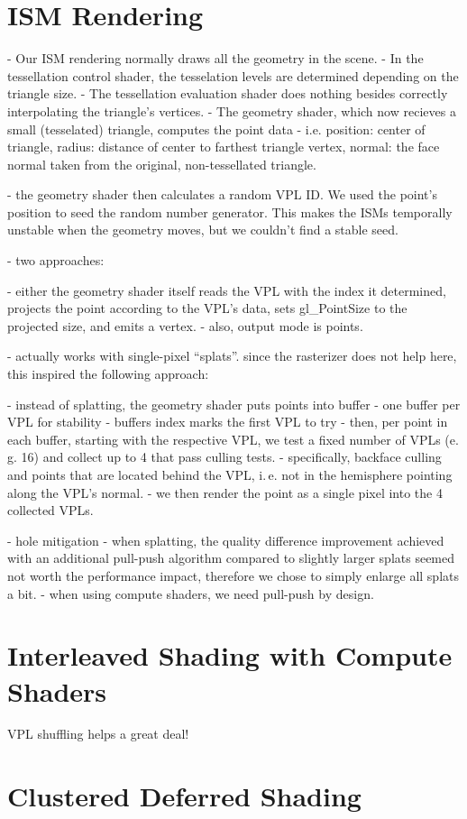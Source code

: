 \section{ISM Rendering}
\label{sec:impl:ismRendering}
- Our ISM rendering normally draws all the geometry in the scene.
- In the tessellation control shader, the tesselation levels are determined depending on the triangle size.
- The tessellation evaluation shader does nothing besides correctly interpolating the triangle's vertices.
- The geometry shader, which now recieves a small (tesselated) triangle, computes the point data
- i.e. position: center of triangle, radius: distance of center to farthest triangle vertex, normal: the face normal taken from the original, non-tessellated triangle.

- the geometry shader then calculates a random VPL ID. We used the point's position to seed the random number generator. This makes the ISMs temporally unstable when the geometry moves, but we couldn't find a stable seed.


- two approaches:

- either the geometry shader itself reads the VPL with the index it determined, projects the point according to the VPL's data, sets gl\_PointSize to the projected size, and emits a vertex.
- also, output mode is points.

- \citet{Marroquim:2007:reconstruction} actually works with single-pixel ``splats''. since the rasterizer does not help here, this inspired the following approach:

- instead of splatting, the geometry shader puts points into buffer
- one buffer per VPL for stability
- buffers index marks the first VPL to try
- then, per point in each buffer, starting with the respective VPL, we test a fixed number of VPLs (e.\,g. 16) and collect up to 4 that pass culling tests.
- specifically, backface culling and points that are located behind the VPL, i.\,e. not in the hemisphere pointing along the VPL's normal.
- we then render the point as a single pixel into the 4 collected VPLs.



- hole mitigation
- when splatting, the quality difference improvement achieved with an additional pull-push algorithm compared to slightly larger splats seemed not worth the performance impact, therefore we chose to simply enlarge all splats a bit.
- when using compute shaders, we need pull-push by design.


\section{Interleaved Shading with Compute Shaders}
\label{sec:impl:interleavedShading}
VPL shuffling helps a great deal!

\section{Clustered Deferred Shading}
\label{sec:impl:clusteredShading}
